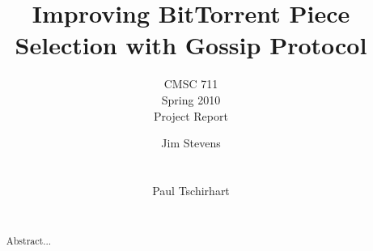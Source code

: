 \documentclass[twocolumn]{sig-alternate}
\begin{document}
\title{Improving BitTorrent Piece Selection with Gossip Protocol}

\subtitle{CMSC 711 \\ Spring 2010 \\ Project Report}

\author{ 
\alignauthor
Jim Stevens\\
	\\
	\\
\alignauthor
Paul Tschirhart\\
	\\
}

\maketitle


\begin{abstract}
Abstract...
\end{abstract}











\end{document}

